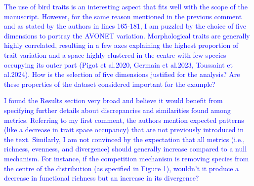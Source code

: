 \documentclass[
]{article}
\begin{document}

\textcolor{blue}{The use of bird traits is an interesting aspect that fits well with the scope of the manuscript.
However, for the same reason mentioned in the previous comment and as stated by the authors in lines 165-181, I am puzzled by the choice of five dimensions to portray the AVONET variation.
Morphological traits are generally highly correlated, resulting in a few axes explaining the highest proportion of trait variation and a space highly clustered in the centre with few species occupying its outer part (Pigot et al.2020, Germain et al.2023, Toussaint et al.2024).
How is the selection of five dimensions justified for the analysis? Are these properties of the dataset considered important for the example?}

\textcolor{blue}{I found the Results section very broad and believe it would benefit from specifying further details about discrepancies and similarities found among metrics.
Referring to my first comment, the authors mention expected patterns (like a decrease in trait space occupancy) that are not previously introduced in the text.
Similarly, I am not convinced by the expectation that all metrics (i.e., richness, evenness, and divergence) should generally increase compared to a null mechanism.
For instance, if the competition mechanism is removing species from the centre of the distribution (as specified in Figure 1), wouldn't it produce a decrease in functional richness but an increase in its divergence?}
\end{document}
